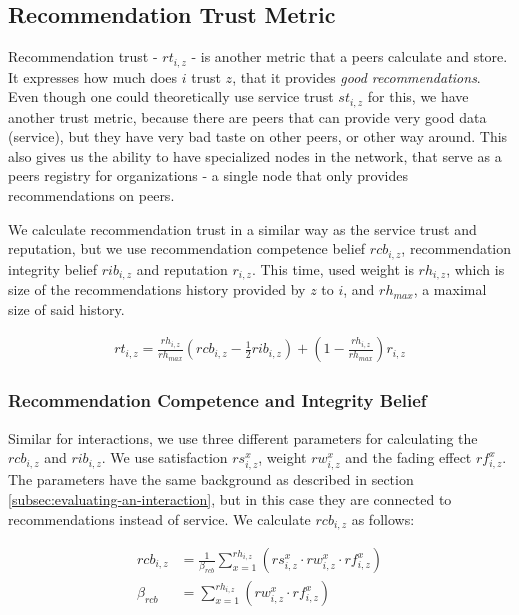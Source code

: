 \subsection{Recommendation Trust Metric}
\label{subsec:recommendation-trust-metric}
Recommendation trust - $rt_{i,z}$ - is another metric that a peers calculate and store. It expresses how much does $i$ trust $z$, that it provides \textit{good recommendations}.
Even though one could theoretically use service trust $st_{i, z}$ for this,
we have another trust metric, because there are peers that can provide very good data (service), but they have very bad taste on other peers, or other way around.
This also gives us the ability to have specialized nodes in the network, that serve as a peers registry for organizations - a single node that only provides recommendations on peers.

We calculate recommendation trust in a similar way as the service trust and reputation, but we use recommendation competence belief $rcb_{i, z}$, recommendation integrity belief $rib_{i,z}$ and reputation $r_{i, z}$.
This time, used weight is $rh_{i,z}$, which is size of the recommendations history provided by $z$ to $i$, and $rh_{max}$, a maximal size of said history.

\begin{equation}
\label{eq:recommendation-trust}
\begin{split}
    rt_{i, z} = \frac{rh_{i,z}}{rh_{max}} \left(rcb_{i,z} - \frac{1}{2} rib_{i, z} \right) + \left(1 - \frac{rh_{i,z}}{rh_{max}} \right) r_{i,z}
\end{split}
\end{equation}

\subsubsection{Recommendation Competence and Integrity Belief}
\label{subsubsec:recommendation-competence-integrity-belief}
Similar for interactions, we use three different parameters for calculating the $rcb_{i, z}$ and $rib_{i,z}$. 
We use satisfaction $rs^{x}_{i, z}$, weight $rw^{x}_{i, z}$ and the fading effect $rf^{x}_{i, z}$. 
The parameters have the same background as described in section \ref{subsec:evaluating-an-interaction}, but in this case they are connected to recommendations instead of service.
We calculate $rcb_{i, z}$ as follows:

\begin{equation}
\begin{split}
    rcb_{i, z} &= \frac{1}{\beta_{rcb}} \sum_{x = 1}^{rh_{i, z}}\left(rs_{i,z}^{x} \cdot rw_{i, z}^{x} \cdot rf_{i,z}^{x}\right) \\
    \beta_{rcb} &= \sum_{x = 1}^{rh_{i, z}}\left(rw_{i, z}^{x} \cdot rf_{i,z}^{x}\right)
\end{split}
\end{equation}

